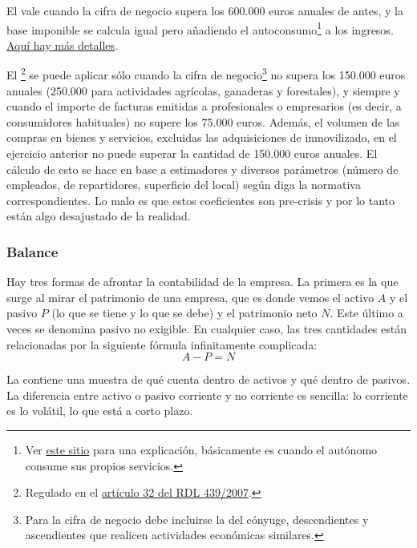 \documentclass[nochap,palatino,shortheader]{apuntes}
\begin{document}
El  vale cuando la cifra de negocio supera los 600.000 euros anuales de antes, y la base imponible se calcula igual pero añadiendo el autoconsumo\footnote{Ver \href{http://www.pymesyautonomos.com/fiscalidad-y-contabilidad/el-autoconsumo-de-bienes-y-servicios-tratamiento-fiscal-y-contable}{este sitio} para una explicación, básicamente es cuando el autónomo consume sus propios servicios.} a los ingresos. \href{http://portal.circe.es/es-ES/emprendedor/EmpresarioIndividual/TributacionAutonomos/Paginas/autonomoestimacionDirectaNormal.aspx}{Aquí hay más detalles}.

El \footnote{Regulado en el \href{https://www.boe.es/buscar/act.php?id=BOE-A-2007-6820}{artículo 32 del RDL 439/2007}.} se puede aplicar sólo cuando la cifra de negocio\footnote{Para la cifra de negocio debe incluirse la del cónyuge, descendientes y ascendientes que realicen actividades económicas similares.} no supera los 150.000 euros anuales (250.000 para actividades agrícolas, ganaderas y forestales), y siempre y cuando el importe de facturas emitidas a profesionales o empresarios (es decir, a consumidores habituales) no supere los 75.000 euros. Además, el volumen de las compras en bienes y servicios, excluidas las adquisiciones de inmovilizado, en el ejercicio anterior no puede superar la cantidad de 150.000 euros anuales. El cálculo de esto se hace en base a estimadores y diversos parámetros (número de empleados, de repartidores, superficie del local) según diga la normativa correspondientes. Lo malo es que estos coeficientes son pre-crisis y por lo tanto están algo desajustado de la realidad.%

\subsubsection{Balance}

Hay tres formas de afrontar la contabilidad de la empresa. La primera es la que surge al mirar el patrimonio de una empresa, que es donde vemos el activo $A$ y el pasivo $P$ (lo que se tiene y lo que se debe) y el patrimonio neto $N$. Este último a veces se denomina pasivo no exigible. En cualquier caso, las tres cantidades están relacionadas por la siguiente fórmula infinitamente complicada: \[ A - P = N\]

La  contiene una muestra de qué cuenta dentro de activos y qué dentro de pasivos. La diferencia entre activo o pasivo corriente y no corriente es sencilla: lo corriente es lo volátil, lo que está a corto plazo.
\end{document}

